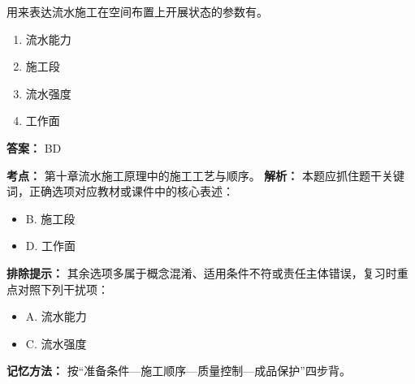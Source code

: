 \documentclass[UTF8,fontset=fandol,11pt]{ctexart}
\begin{document}
\begin{quizbox}[title={第 20 题}]
用来表达流水施工在空间布置上开展状态的参数有。\\
\begin{enumerate}[label=\Alph*.]
\item 流水能力
\item 施工段
\item 流水强度
\item 工作面
\end{enumerate}
\textbf{答案：} BD
\vspace{0.25em}
\begin{answerbox}[title={考点解析}]
\textbf{考点：} 第十章流水施工原理中的施工工艺与顺序。
\textbf{解析：} 本题应抓住题干关键词，正确选项对应教材或课件中的核心表述：
\begin{itemize}
\item B. 施工段
\item D. 工作面
\end{itemize}
\textbf{排除提示：} 其余选项多属于概念混淆、适用条件不符或责任主体错误，复习时重点对照下列干扰项：
\begin{itemize}
\item A. 流水能力
\item C. 流水强度
\end{itemize}
\textbf{记忆方法：} 按“准备条件—施工顺序—质量控制—成品保护”四步背。
\end{answerbox}
\end{quizbox}

\vspace{0.2em}
\end{document}
